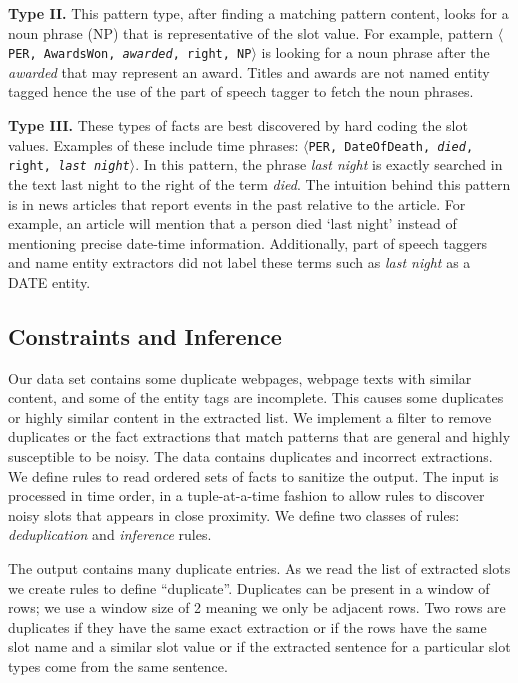 \documentclass[letterpaper]{article}
\begin{document}
\textbf{Type II.} This pattern type, after finding a matching pattern content, looks for a noun phrase (NP)
that is representative of the slot value.
For example, pattern $\langle$\texttt{PER, AwardsWon, \textit{awarded}, right, NP}$\rangle$
is looking for a noun phrase after the \textit{awarded} that may represent an award.
Titles and awards are not named entity tagged hence the use of the part of speech tagger to fetch the noun phrases.

\textbf{Type III.} These types of facts are best discovered by hard coding the slot values.
Examples of these include time phrases: $\langle$\texttt{PER, DateOfDeath, \textit{died}, right, \textit{last night}}$\rangle$.
In this pattern, the phrase \textit{last night} is exactly searched in the text {last night} to the right of the term \textit{died}.
The intuition behind this pattern is in news articles that report events in the past relative to the article. 
For example, an article will mention that  
a person died `last night' instead of mentioning precise date-time information.
Additionally, part of speech taggers and name entity extractors did not label these terms such as 
\textit{last night} as a DATE entity. 


\subsection{Constraints and Inference}%
\label{sec:constraintsandinference}

Our data set contains some duplicate webpages, webpage texts with similar content, 
and some of the entity tags are incomplete.
This causes some duplicates or highly similar content in the extracted list. 
We implement a filter to remove duplicates or the fact extractions that match patterns that are general and highly susceptible to be noisy.
The data contains duplicates and incorrect extractions.
We define rules to read ordered sets of facts to sanitize the output.
The input is processed in time order, in a tuple-at-a-time fashion to allow rules to discover noisy slots 
that appears in close proximity.
We define two classes of rules: \textit{deduplication} and \textit{inference} rules.

The output contains many duplicate entries.
As we read the list of extracted slots we create rules to define ``duplicate''.
Duplicates can be present in a window of rows; we use a window size of 2 meaning we only be adjacent rows.
Two rows are duplicates if they have the same exact extraction or if the rows have the same slot name and a similar slot value or if the extracted sentence for a particular slot types come from the same sentence.
\end{document}
